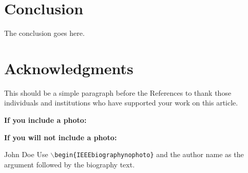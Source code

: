 \documentclass[lettersize,journal]{IEEEtran}
\begin{document}
 \section{Conclusion}\label{sec:conclusion}
 The conclusion goes here.


 \section*{Acknowledgments}
 This should be a simple paragraph before the References to thank those individuals and institutions who have supported your work on this article.









 
 
%
%


%




 \newpage



 \vspace{11pt}

 \textbf{If you include a photo:}\vspace{-33pt}

 \vspace{11pt}

 \textbf{If you will not include a photo:}\vspace{-33pt}
 \begin{IEEEbiographynophoto}{John Doe}
  Use $\backslash${\texttt{begin\{IEEEbiographynophoto\}}} and the author name as the argument followed by the biography text.
 \end{IEEEbiographynophoto}




 \vfill
\end{document}
